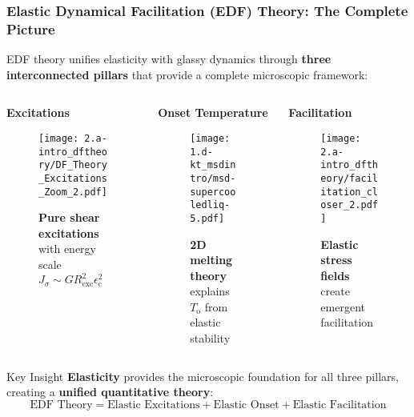 \begin{frame}\label{a.3}
\frametitle{Elastic Dynamical Facilitation (EDF) Theory: The Complete Picture}

EDF theory unifies elasticity with glassy dynamics through \textbf{three interconnected pillars} that provide a complete microscopic framework:

\vspace{0.5em}

\begin{columns}[T]
\begin{column}[T]{0.33\textwidth}

\centering\textbf{\Large Excitations}

\begin{figure}[t]
\centering\texttt{[image: 2.a-intro\_dftheory/DF\_Theory\_Excitations\_Zoom\_2.pdf]}
\caption{\textbf{Pure shear excitations} with energy scale $J_\sigma \sim G R_\mathrm{exc}^2 \epsilon_\mathrm{c}^2$}
\end{figure}

\end{column}

\begin{column}[T]{0.33\textwidth}

\centering\textbf{\Large Onset Temperature}

\begin{figure}[t]
\begin{center}
\centerline{\texttt{[image: 1.d-kt\_msdintro/msd-supercooledliq-5.pdf]}}
\end{center}
\caption{\textbf{2D melting theory} explains $T_\mathrm{o}$ from elastic stability}
\end{figure}

\end{column}

\begin{column}[T]{0.33\textwidth}

\centering\textbf{\Large Facilitation}

\begin{figure}[t]
\begin{center}
\centerline{\texttt{[image: 2.a-intro\_dftheory/facilitation\_closer\_2.pdf]}}
\end{center}
\caption{\textbf{Elastic stress fields} create emergent facilitation}
\end{figure}

\end{column}
\end{columns}

\vspace{1em}

\begin{block}{\centering Key Insight}
\centering \textbf{Elasticity} provides the microscopic foundation for all three pillars, creating a \textbf{unified quantitative theory}: 
$$\boxed{\text{EDF Theory} = \text{Elastic Excitations} + \text{Elastic Onset} + \text{Elastic Facilitation}}$$
\end{block}

\end{frame} 